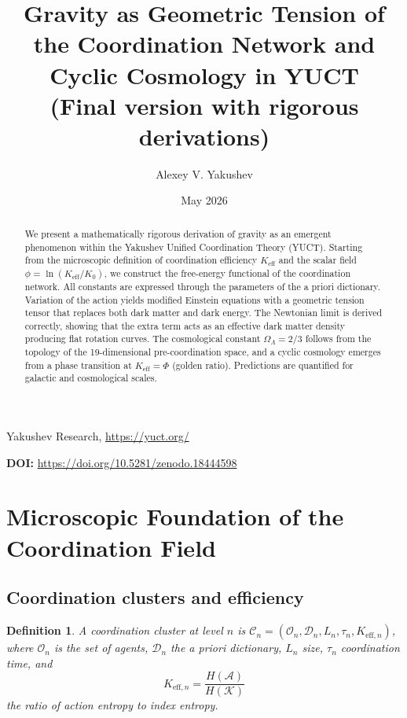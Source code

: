 \documentclass[12pt,a4paper]{article}
\title{\bfseries Gravity as Geometric Tension of\\ the Coordination Network and Cyclic Cosmology in YUCT\\(Final version with rigorous derivations)}
\author{Alexey V. Yakushev}
\date{May 2026}
\newtheorem{definition}[theorem]{Definition}
\newcommand{\Dir}{\mathcal{D}}
\begin{document}
	

\maketitle

\vspace{0.3cm}
{\normalsize Yakushev Research, \url{https://yuct.org/}\par}

\vspace{0.3cm}
\textbf{DOI:} \url{https://doi.org/10.5281/zenodo.18444598}

	
	\begin{abstract}
		We present a mathematically rigorous derivation of gravity as an emergent phenomenon within the Yakushev Unified Coordination Theory (YUCT). Starting from the microscopic definition of coordination efficiency \(K_{\mathrm{eff}}\) and the scalar field \(\phi = \ln (K_{\mathrm{eff}}/K_0)\), we construct the free-energy functional of the coordination network. All constants are expressed through the parameters of the a priori dictionary. Variation of the action yields modified Einstein equations with a geometric tension tensor that replaces both dark matter and dark energy. The Newtonian limit is derived correctly, showing that the extra term acts as an effective dark matter density producing flat rotation curves. The cosmological constant \(\Omega_\Lambda = 2/3\) follows from the topology of the 19-dimensional pre-coordination space, and a cyclic cosmology emerges from a phase transition at \(K_{\mathrm{eff}} = \Phi\) (golden ratio). Predictions are quantified for galactic and cosmological scales.
	\end{abstract}
	
	\tableofcontents
	
	\section{Microscopic Foundation of the Coordination Field}
	
	\subsection{Coordination clusters and efficiency}
	\begin{definition}
		A coordination cluster at level \(n\) is \(\mathcal{C}_n = (\mathcal{O}_n, \Dir_n, L_n, \tau_n, K_{\mathrm{eff},n})\), where \(\mathcal{O}_n\) is the set of agents, \(\Dir_n\) the a priori dictionary, \(L_n\) size, \(\tau_n\) coordination time, and
		\[
		K_{\mathrm{eff},n} = \frac{H(\mathcal{A})}{H(\mathcal{K})}
		\]
		the ratio of action entropy to index entropy.
	\end{definition}
	
\end{document}

